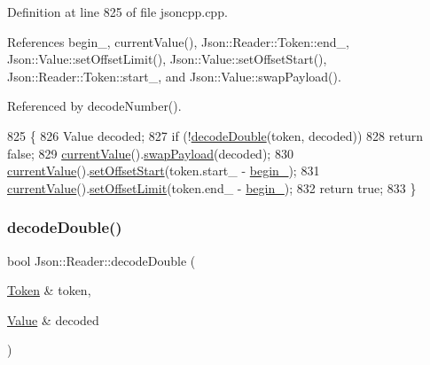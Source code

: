 Definition at line 825 of file jsoncpp.\+cpp.



References begin\+\_\+, current\+Value(), Json\+::\+Reader\+::\+Token\+::end\+\_\+, Json\+::\+Value\+::set\+Offset\+Limit(), Json\+::\+Value\+::set\+Offset\+Start(), Json\+::\+Reader\+::\+Token\+::start\+\_\+, and Json\+::\+Value\+::swap\+Payload().



Referenced by decode\+Number().


\begin{DoxyCode}
825                                       \{
826   Value decoded;
827   \textcolor{keywordflow}{if} (!\hyperlink{class_json_1_1_reader_a2420bbb7fd6d5d3e7e2fea894dd8f70f}{decodeDouble}(token, decoded))
828     \textcolor{keywordflow}{return} \textcolor{keyword}{false};
829   \hyperlink{class_json_1_1_reader_a85597f763fb0148a17359b6dfc6f7326}{currentValue}().\hyperlink{class_json_1_1_value_a5263476047f20e2fc6de470e4de34fe5}{swapPayload}(decoded);
830   \hyperlink{class_json_1_1_reader_a85597f763fb0148a17359b6dfc6f7326}{currentValue}().\hyperlink{class_json_1_1_value_a92e32ea0f4f8a15853a3cf0beac9feb9}{setOffsetStart}(token.start\_ - \hyperlink{class_json_1_1_reader_a327166839022ea91f0a8290960a8af76}{begin\_});
831   \hyperlink{class_json_1_1_reader_a85597f763fb0148a17359b6dfc6f7326}{currentValue}().\hyperlink{class_json_1_1_value_a5e4f5853fec138150c5df6004a8c2bcf}{setOffsetLimit}(token.end\_ - \hyperlink{class_json_1_1_reader_a327166839022ea91f0a8290960a8af76}{begin\_});
832   \textcolor{keywordflow}{return} \textcolor{keyword}{true};
833 \}
\end{DoxyCode}
\mbox{\label{class_json_1_1_reader_a5e4a66be7c413bca86078f14df5eb802}} 
\subsubsection{\texorpdfstring{decode\+Double()}{decodeDouble()}\hspace{0.1cm}{\footnotesize\ttfamily [2/2]}}
{\footnotesize\ttfamily bool Json\+::\+Reader\+::decode\+Double (\begin{DoxyParamCaption}\item[{\hyperlink{class_json_1_1_reader_1_1_token}{Token} \&}]{token,  }\item[{\hyperlink{class_json_1_1_value}{Value} \&}]{decoded }\end{DoxyParamCaption})\hspace{0.3cm}{\ttfamily [private]}}



